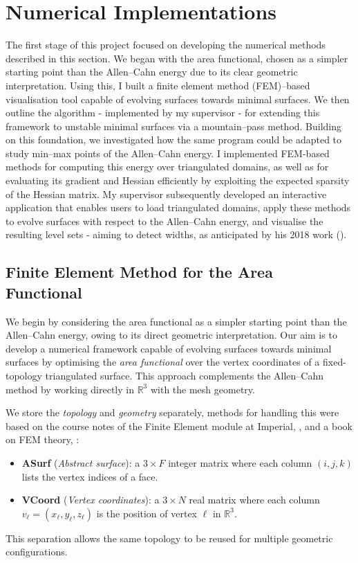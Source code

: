 \section{Numerical Implementations}
The first stage of this project focused on developing the numerical methods described in this section. We began with the area functional, chosen as a simpler starting point than the Allen–Cahn energy due to its clear geometric interpretation. Using this, I built a finite element method (FEM)–based visualisation tool capable of evolving surfaces towards minimal surfaces. We then outline the algorithm - implemented by my supervisor - for extending this framework to unstable minimal surfaces via a mountain–pass method.  
\noindent Building on this foundation, we investigated how the same program could be adapted to study min--max points of the Allen–Cahn energy. I implemented FEM-based methods for computing this energy over triangulated domains, as well as for evaluating its gradient and Hessian efficiently by exploiting the expected sparsity of the Hessian matrix. My supervisor subsequently developed an interactive application that enables users to load triangulated domains, apply these methods to evolve surfaces with respect to the Allen–Cahn energy, and visualise the resulting level sets - aiming to detect widths, as anticipated by his 2018 work (\cite{Guaraco18}).

\subsection{Finite Element Method for the Area Functional}\label{sec:minimal-surfaces-program}
We begin by considering the area functional as a simpler starting point than the Allen–Cahn energy, owing to its direct geometric interpretation. Our aim is to develop a numerical framework capable of evolving surfaces towards minimal surfaces by optimising the \emph{area functional} over the vertex coordinates of a fixed-topology triangulated surface. This approach complements the Allen–Cahn method by working directly in $\mathbb{R}^3$ with the mesh geometry.

\noindent We store the \emph{topology} and \emph{geometry} separately, methods for handling this were based on the course notes of the Finite Element module at Imperial, \cite{FEMnotes}, and a book on FEM theory, \cite{Ern04}:
\begin{itemize}
    \item \textbf{ASurf} (\emph{Abstract surface}): a $3\times F$ integer matrix where each column $(i,j,k)$ lists the vertex indices of a face.
    \item \textbf{VCoord} (\emph{Vertex coordinates}): a $3\times N$ real matrix where each column $v_\ell = (x_\ell, y_\ell, z_\ell)$ is the position of vertex $\ell$ in $\mathbb{R}^3$.
\end{itemize}
This separation allows the same topology to be reused for multiple geometric configurations.

